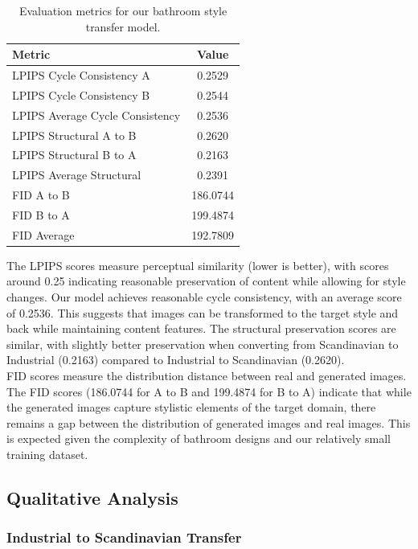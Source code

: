 \documentclass[twocolumn,superscriptaddress,aps]{revtex4-1}
\begin{document}
\begin{table}[h]
\centering
\begin{tabular}{lc}
\hline
\textbf{Metric} & \textbf{Value} \\
\hline
LPIPS Cycle Consistency A & 0.2529 \\
LPIPS Cycle Consistency B & 0.2544 \\
LPIPS Average Cycle Consistency & 0.2536 \\
LPIPS Structural A to B & 0.2620 \\
LPIPS Structural B to A & 0.2163 \\
LPIPS Average Structural & 0.2391 \\
FID A to B & 186.0744 \\
FID B to A & 199.4874 \\
FID Average & 192.7809 \\
\hline
\end{tabular}
\caption{Evaluation metrics for our bathroom style transfer model.}
\label{tab:metrics}
\end{table}

The LPIPS scores measure perceptual similarity (lower is better), with scores around 0.25 indicating reasonable preservation of content while allowing for style changes. Our model achieves reasonable cycle consistency, with an average score of 0.2536. This suggests that images can be transformed to the target style and back while maintaining content features. The structural preservation scores are similar, with slightly better preservation when converting from Scandinavian to Industrial (0.2163) compared to Industrial to Scandinavian (0.2620). \\

FID scores measure the distribution distance between real and generated images. The FID scores (186.0744 for A to B and 199.4874 for B to A) indicate that while the generated images capture stylistic elements of the target domain, there remains a gap between the distribution of generated images and real images. This is expected given the complexity of bathroom designs and our relatively small training dataset.

\subsection{Qualitative Analysis}

\subsubsection{Industrial to Scandinavian Transfer}
\end{document}
